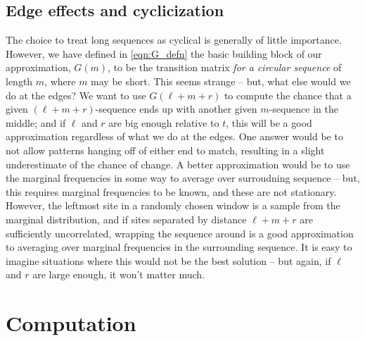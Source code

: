 \documentclass{article}
\theoremstyle{plain}
\theoremstyle{definition}
\begin{document}
\subsection{Edge effects and cyclicization}

The choice to treat long sequences as cyclical is generally of little importance.
However, we have defined in \eqref{eqn:G_defn} the basic building block of our approximation, $G(m)$,
to be the transition matrix \emph{for a circular sequence} of length $m$, where $m$ may be short.
This seems strange -- but, what else would we do at the edges?
We want to use $G(\ell+m+r)$ to compute the chance that a given $(\ell+m+r)$-sequence ends up with another given $m$-sequence in the middle;
and if $\ell$ and $r$ are big enough relative to $t$, this will be a good approximation regardless of what we do at the edges.
One answer would be to not allow patterns hanging off of either end to match,
resulting in a slight underestimate of the chance of change.
A better approximation would be to use the marginal frequencies in some way to average over surroudning sequence 
-- but, this requires marginal frequencies to be known, and these are not stationary.
However, the leftmost site in a randomly chosen window is a sample from the marginal distribution,
and if sites separated by distance $\ell+m+r$ are sufficiently uncorrelated,
wrapping the sequence around is a good approximation to averaging over marginal frequencies in the surrounding sequence.
It is easy to imagine situations where this would not be the best solution --
but again, if $\ell$ and $r$ are large enough, it won't matter much.




\section{Computation}
\end{document}
